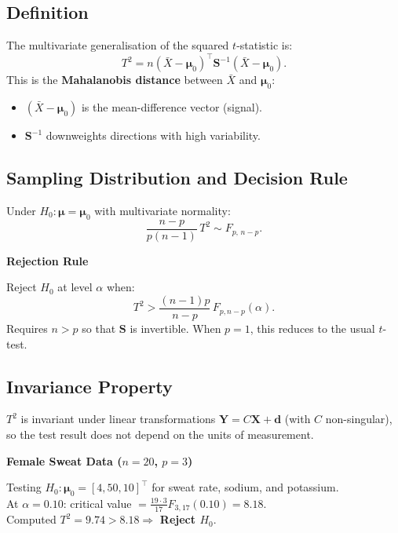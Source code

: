\documentclass[12pt, a4paper]{article}
\newcommand{\Xbar}{\bar{X}}
\newcommand{\muv}{\boldsymbol{\mu}}
\begin{document}
\subsection{Definition}

The multivariate generalisation of the squared $t$-statistic is:
\[
  \boxed{T^2 = n(\Xbar - \muv_0)^{\top}\mathbf{S}^{-1}(\Xbar - \muv_0).}
\]
This is the \textbf{Mahalanobis distance} between $\Xbar$ and $\muv_0$:
\begin{itemize}
  \item $(\Xbar-\muv_0)$ is the mean-difference vector (signal).
  \item $\mathbf{S}^{-1}$ downweights directions with high variability.
\end{itemize}

\subsection{Sampling Distribution and Decision Rule}

Under $H_0: \muv = \muv_0$ with multivariate normality:
\[
  \frac{n-p}{p(n-1)}\,T^2 \sim F_{p,\,n-p}.
\]
\begin{keybox}\noindent\textbf{Rejection Rule}\par\smallskip
Reject $H_0$ at level $\alpha$ when:
\[
  T^2 > \frac{(n-1)p}{n-p}\,F_{p,n-p}(\alpha).
\]
Requires $n > p$ so that $\mathbf{S}$ is invertible. When $p = 1$, this reduces to the usual $t$-test.
\end{keybox}

\subsection{Invariance Property}

$T^2$ is invariant under linear transformations $\mathbf{Y} = C\mathbf{X} + \mathbf{d}$ (with $C$ non-singular), so the test result does not depend on the units of measurement.

\begin{examplebox}\noindent\textbf{Female Sweat Data ($n=20$, $p=3$)}\par\smallskip
Testing $H_0: \muv_0 = [4, 50, 10]^\top$ for sweat rate, sodium, and potassium.\\
At $\alpha = 0.10$: critical value $= \frac{19 \cdot 3}{17}F_{3,17}(0.10) = 8.18$.\\
Computed $T^2 = 9.74 > 8.18 \Rightarrow$ \textbf{Reject $H_0$}.
\end{examplebox}
\end{document}
